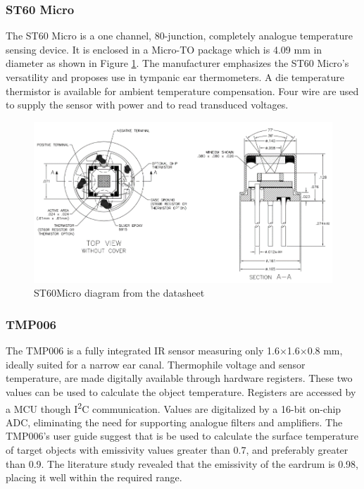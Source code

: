 \subsubsection{ST60 Micro}
The ST60 Micro is a one channel, 80-junction, completely analogue temperature sensing device. It is enclosed in a Micro-TO package which is 4.09 mm in diameter as shown in Figure \ref{fig:ST60Micro}. The manufacturer emphasizes the ST60 Micro's versatility and proposes use in tympanic ear thermometers. A die temperature thermistor is available for ambient temperature compensation. Four wire are used to supply the sensor with power and to read transduced voltages.

 \begin{figure}[h]
   \centering
   \includegraphics[scale=1]{figs/ST60Micro.png}
   \caption{ST60Micro diagram from the datasheet}
   \label{fig:ST60Micro}
\end{figure}

\subsubsection{TMP006}
The TMP006 is a fully integrated IR sensor measuring only 1.6$\times$1.6$\times$0.8 mm, ideally suited for a narrow ear canal. Thermophile voltage and sensor temperature, are made digitally available through hardware registers. These two values can be used to calculate the object temperature. Registers are accessed by a MCU though I\textsuperscript{2}C communication. Values are digitalized by a 16-bit on-chip ADC, eliminating the need for supporting analogue filters and amplifiers.
The TMP006's user guide suggest that is be used to calculate the surface temperature of target objects with emissivity values greater than 0.7, and preferably greater than 0.9. The literature study revealed that the emissivity of the eardrum is 0.98, placing it well within the required range.

